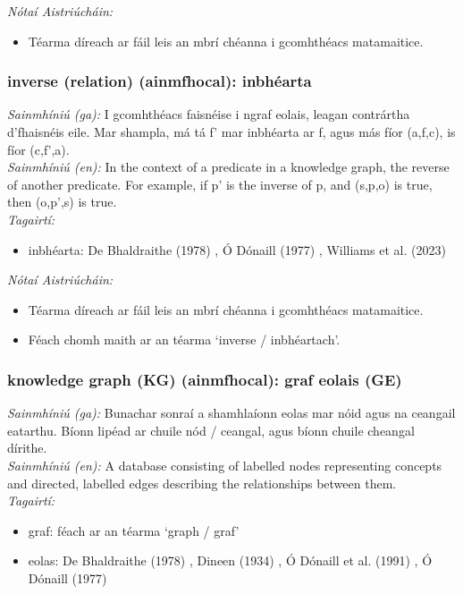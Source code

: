  \noindent \textit{Nótaí Aistriúcháin:}
\begin{itemize}
	\item Téarma díreach ar fáil leis an mbrí chéanna i gcomhthéacs matamaitice.
\end{itemize}


\subsubsection*{inverse (relation) (ainmfhocal): inbhéarta}
 \noindent \textit{Sainmhíniú (ga):} I gcomhthéacs faisnéise i ngraf eolais, leagan contrártha d'fhaisnéis eile. Mar shampla, má tá f' mar inbhéarta ar f, agus más fíor (a,f,c), is fíor (c,f',a).
\\
 \noindent \textit{Sainmhíniú (en):} In the context of a predicate in a knowledge graph, the reverse of another predicate. For example, if p' is the inverse of p, and (s,p,o) is true, then (o,p',s) is true.
\\
 \noindent \textit{Tagairtí:}
\begin{itemize}
	\item inbhéarta: De Bhaldraithe (1978) \cite{de-bhaldraithe}, Ó Dónaill (1977) \cite{odonaill}, Williams et al. (2023) \cite{storchiste}
\end{itemize}

 \noindent \textit{Nótaí Aistriúcháin:}
\begin{itemize}
	\item Téarma díreach ar fáil leis an mbrí chéanna i gcomhthéacs matamaitice.
	\item Féach chomh maith ar an téarma `inverse / inbhéartach'.
\end{itemize}


\subsubsection*{knowledge graph (KG) (ainmfhocal): graf eolais (GE)}
 \noindent \textit{Sainmhíniú (ga):} Bunachar sonraí a shamhlaíonn eolas mar nóid agus na ceangail eatarthu. Bíonn lipéad ar chuile nód / ceangal, agus bíonn chuile cheangal dírithe.
\\
 \noindent \textit{Sainmhíniú (en):} A database consisting of labelled nodes representing concepts and directed, labelled edges describing the relationships between them.
\\
 \noindent \textit{Tagairtí:}
\begin{itemize}
	\item graf: féach ar an téarma `graph / graf'
	\item eolas: De Bhaldraithe (1978) \cite{de-bhaldraithe}, Dineen (1934) \cite{dineen}, Ó Dónaill et al. (1991) \cite{focloir-beag}, Ó Dónaill (1977) \cite{odonaill}
\end{itemize}

